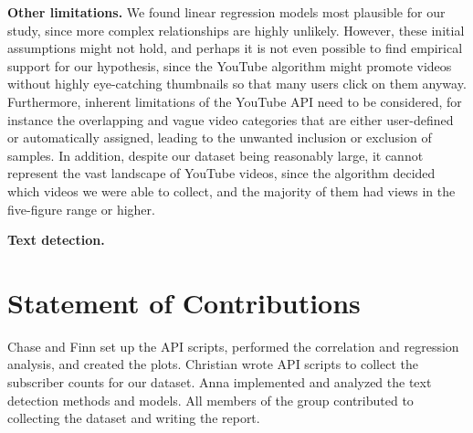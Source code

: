\documentclass{article}
\begin{document}
\textbf{Other limitations.} We found linear regression models most plausible for our study, since more complex relationships are highly unlikely. However, these initial assumptions might not hold, and perhaps it is not even possible to find empirical support for our hypothesis, since the YouTube algorithm might promote videos without highly eye-catching thumbnails so that many users click on them anyway. Furthermore, inherent limitations of the YouTube API need to be considered, for instance the overlapping and vague video categories that are either user-defined or automatically assigned, leading to the unwanted inclusion or exclusion of samples. In addition, despite our dataset being reasonably large, it cannot represent the vast landscape of YouTube videos, since the algorithm decided which videos we were able to collect, and the majority of them had views in the five-figure range or higher.

\textbf{Text detection.}

\section{Statement of Contributions}


Chase and Finn set up the API scripts, performed the correlation and regression analysis, and created the plots. Christian wrote API scripts to collect the subscriber counts for our dataset. Anna implemented and analyzed the text detection methods and models. All members of the group contributed to collecting the dataset and writing the report.




\end{document}
